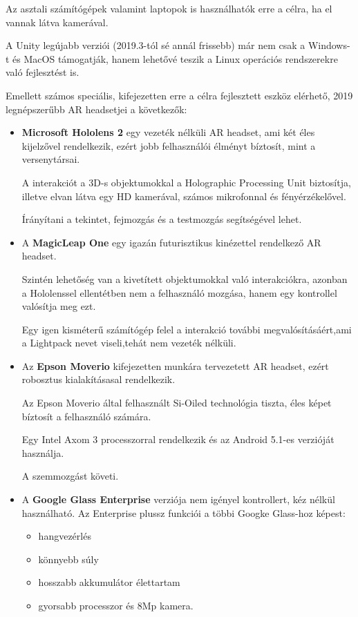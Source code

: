 Az asztali számítógépek valamint laptopok is használhatók erre a célra, ha el vannak látva kamerával.

A Unity legújabb verziói (2019.3-tól sé annál frissebb) már nem csak a Windows-t és MacOS támogatják, hanem  lehetővé teszik a Linux operációs rendszerekre való fejlesztést is.

Emellett számos speciális, kifejezetten erre a célra fejlesztett eszköz elérhető, 2019 legnépszerűbb AR headsetjei a következők:
\begin{itemize}
\item {\bf Microsoft Hololens 2} egy vezeték nélküli AR headset, ami két éles kijelzővel rendelkezik, ezért jobb felhasználói élményt bíztosít, mint a versenytársai.

A interakciót a 3D-s objektumokkal a Holographic Processing Unit biztosítja, illetve elvan látva egy HD kamerával, számos mikrofonnal és fényérzékelővel.

Írányítani a tekintet, fejmozgás és a testmozgás segítségével lehet. 
\item A {\bf MagicLeap One} egy igazán futurisztikus kinézettel rendelkező AR headset.

Szintén lehetőség van a kivetített objektumokkal való interakciókra, azonban a Hololenssel ellentétben nem a felhasználó mozgása, hanem egy kontrollel valósítja meg ezt. 

Egy igen kisméterű számítógép felel a interakció további megvalósításáért,ami a Lightpack nevet viseli,tehát nem vezeték nélküli.
  
\item Az {\bf Epson Moverio} kifejezetten munkára tervezetett AR headset, ezért robosztus kialakításasal rendelkezik.

Az Epson Moverio által felhasznált Si-Oiled technológia tiszta, éles képet bíztosít a felhasználó számára.

Egy Intel Axom 3 processzorral rendelkezik és az Android 5.1-es verzióját használja. 

A szemmozgást követi.
\item A {\bf Google Glass Enterprise} verziója nem igényel kontrollert, kéz nélkül használható.
Az Enterprise plussz funkciói a többi Googke Glass-hoz képest:
\begin{itemize}
\item hangvezérlés
\item könnyebb súly
\item hosszabb akkumulátor élettartam
\item gyorsabb processzor és 8Mp kamera. \cite{arhardware}
\end{itemize}
\end{itemize}


